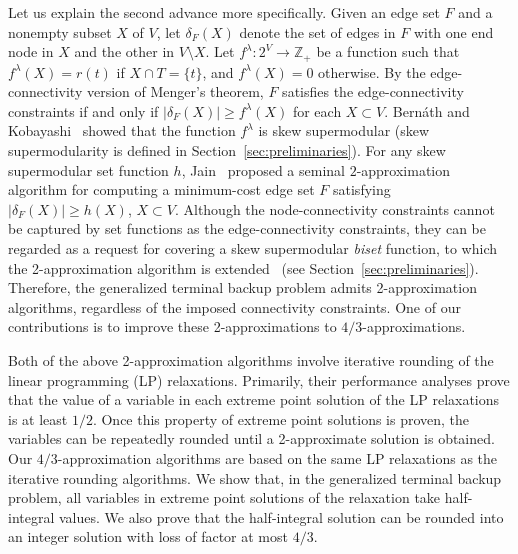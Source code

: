 \documentclass{article}
\newcommand{\Zset}{\mathbb{Z}}
\newcommand{\g}{f^{\lambda}}
\begin{document}
Let us explain the second advance more specifically.
Given an edge set $F$ and a nonempty subset $X$ of $V$, 
let $\delta_F(X)$ denote the set of edges in $F$ with one end node
in $X$ and the other in $V\setminus X$. 
Let $\g\colon 2^V \rightarrow \Zset_+$ be a function such that 
$\g(X)=r(t)$ if $X\cap T=\{t\}$, and $\g(X)=0$ otherwise. 
By the edge-connectivity version of 
Menger's theorem, $F$ satisfies the edge-connectivity constraints if and only if
$|\delta_F(X)| \geq \g(X)$ for each $X \subset V$. 
Bern{\'a}th and
Kobayashi~\cite{Bernath2014} showed that the function $\g$ is skew supermodular 
(skew supermodularity is defined in Section~\ref{sec:preliminaries}). 
For any skew supermodular set function $h$,
Jain~\cite{Jain01} proposed a seminal $2$-approximation algorithm for computing
a minimum-cost edge set $F$
satisfying $|\delta_F(X)| \geq h(X)$, $X \subset V$.
Although the node-connectivity constraints cannot be captured by set functions 
as the edge-connectivity constraints,
they can be regarded as a request for covering a skew supermodular
\emph{biset} function, to which the 2-approximation algorithm is extended~\cite{FleischerJW06} 
(see Section~\ref{sec:preliminaries}). Therefore, the
generalized terminal backup problem admits 2-approximation algorithms, 
regardless of the imposed connectivity constraints. 
One of our contributions is to improve these 2-approximations to
$4/3$-approximations.


Both of the above 2-approximation algorithms involve 
iterative rounding of the linear programming (LP) relaxations.
Primarily, their performance analyses
prove that the value of a variable in each extreme point solution of the LP relaxations
is at least $1/2$. Once this property of extreme point solutions is proven,
the variables can be repeatedly rounded until 
a 2-approximate solution is obtained. 
Our $4/3$-approximation algorithms are based on the same LP 
relaxations as the iterative rounding algorithms. We
show that, in the generalized terminal backup problem,
all variables in extreme point solutions of the relaxation take 
half-integral values.
We also prove that the half-integral solution can be rounded into an integer solution
with loss of factor at most $4/3$.
\end{document}
